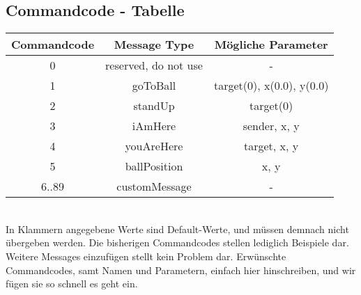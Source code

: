 \subsection{Commandcode - Tabelle}

\begin{tabular}{|c|c|c|}
\hline 
Commandcode & Message Type & Mögliche Parameter \\ 
\hline 
0 & reserved, do not use & - \\ 
\hline 
1 & goToBall & target(0), x(0.0), y(0.0) \\ 
\hline 
2 & standUp & target(0)\\ 
\hline 
3 & iAmHere & sender, x, y \\ 
\hline 
4 & youAreHere & target, x, y \\ 
\hline 
5 & ballPosition & x, y \\ 
\hline 
6..89 & customMessage & - \\ 
\hline 
\end{tabular}\\
In Klammern angegebene Werte sind Default-Werte, und müssen demnach nicht übergeben werden.
Die bisherigen Commandcodes stellen lediglich Beispiele dar. Weitere Messages einzufügen stellt kein Problem dar. 
Erwünschte Commandcodes, samt Namen und Parametern, einfach hier hinschreiben, und wir fügen sie so schnell es geht ein.